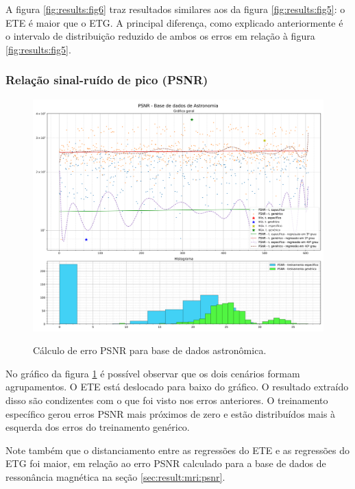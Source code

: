 A figura \ref{fig:results:fig6} traz resultados similares aos da figura \ref{fig:results:fig5}: o ETE é maior que o ETG. A principal diferença, como explicado anteriormente é o intervalo de distribuição reduzido de ambos os erros em relação à figura \ref{fig:results:fig5}.

\subsubsection{Relação sinal-ruído de pico (PSNR)}
\label{sec:result:astronomy:psnr}

\begin{figure}[H]
    \centering
    \caption{Cálculo de erro PSNR para base de dados astronômica.}
    \includegraphics[width=16cm]{fig/resultados/astronomy/png/psnr_astronomy_compound.png}
    \label{fig:results:fig7}
\end{figure}

No gráfico da figura \ref{fig:results:fig7} é possível observar que os dois cenários formam agrupamentos. O ETE está deslocado para baixo do gráfico. O resultado extraído disso são condizentes com o que foi visto nos erros anteriores. O treinamento específico gerou erros PSNR mais próximos de zero e estão distribuídos mais à esquerda dos erros do treinamento genérico.

Note também que o distanciamento entre as regressões do ETE e as regressões do ETG foi maior, em relação ao erro PSNR calculado para a base de dados de ressonância magnética na seção \ref{sec:result:mri:psnr}. 

